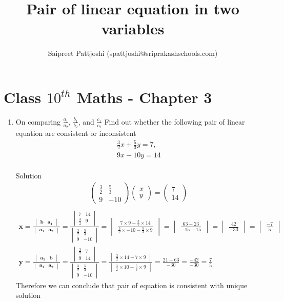\documentclass[12pt]{article}
\title{Pair of linear equation in two variables}
\author{Saipreet Pattjoshi (spattjoshi@sriprakashschools.com)}
\newcommand{\myvec}[1]{\ensuremath{\begin{pmatrix}#1\end{pmatrix}}}
\newcommand{\mydet}[1]{\ensuremath{\begin{vmatrix}#1\end{vmatrix}}}
\let\vec\mathbf
\begin{document}
\maketitle
\section*{Class $10^{th}$ Maths - Chapter 3}
\begin{enumerate}
\item On comparing $\frac{a_1}{a_2}$, $\frac{b_1}{b_2}$, and $\frac{c_1}{c_2} $
Find out whether the following pair of linear equation are consistent or inconsistent\\
\begin{align}
 \frac{3}{2}x + \frac{5}{3}y=7,\\
9x-10y=14
 \end{align}
\\
Solution
\begin{align}
 \myvec{ \frac{3}{2} & \frac{5}{3} \\ 9 &-10}
\myvec{x\\y}
=\myvec{7\\14}\\
\end{align}
\begin{align}
\vec{x}=\frac{\mydet{\vec{b} & \vec{a_1}}}{\mydet{\vec{a_1} & \vec{a_2}}}=\frac{ \mydet{7&14\\ \frac{3}{2}&9}}{\mydet{\frac{3}{2}&\frac{5}{3}\\ 9&-10}}
=\mydet{\frac{7\times9 - \frac{3}{2} \times14}{\frac{3}{2}\times-10-\frac{5}{3}\times9}}
= \mydet{\frac{63-23}{-15-15}}
= \mydet{\frac{42}{-30}}
= \mydet{\frac{-7}{5}}
\\\vec{y}= \frac{\mydet{\vec{a_1} & \vec{b}}}{\mydet{\vec{a_1}&\vec{a_2}}}
= \frac{\mydet{\frac{3}{2}&7\\9&14}}{\mydet{\frac{3}{2}&\frac{5}{3}\\9&-10}}= \frac{\mydet{\frac{3}{2}\times14 - 7\times9}}{\mydet{\frac{3}{2}\times10 -\frac{5}{3}\times9} }= \frac{21-63}{-30}
= \frac{-42}{-30}= \frac{7}{5}
\end{align}
Therefore we can conclude that pair of equation is consistent with unique solution
\end{enumerate}
\end{document}
